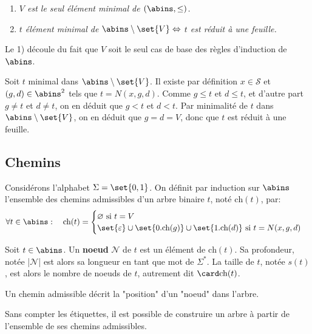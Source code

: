 \documentclass{scrartcl}
\begin{document}
			\begin{enumerate}
				\item \textsl{$V$ est le seul élément minimal de $(\abins, \leq)$.}
				\item \textsl{$t$ élément minimal de $\abins\setminus\set{V} \Leftrightarrow$ $t$ est réduit à une feuille.}
			\end{enumerate}
			\begin{demo}
				\item Le 1) découle du fait que $V$ soit le seul cas de base des règles d'induction de $\abins$.
				\item Soit $t$ minimal dans $\abins\setminus\set{V}$. 
				Il existe par définition $x \in \mathcal{S}$ et $(g,d) \in \abins^2$ tels que $t = N(x,g,d)$.
				Comme $g \leq t$ et $d \leq t$, et d'autre part $g \neq t$ et $d \neq t$,
				on en déduit que $g < t$ et $d < t$. 
				Par minimalité de $t$ dans $\abins\setminus\set{V}$, on en déduit que $g = d =V$,
				donc que $t$ est réduit à une feuille.
			\end{demo}

		\subsection{Chemins}
			Considérons l'alphabet $\Sigma = \set{0,1}$. 
			On définit par induction sur $\abins$ l'ensemble des chemins admissibles d'un arbre binaire $t$,
			noté $\text{ch}(t)$, par:
			\[
				\forall t \in \abins: \quad \text{ch}(t) = 
				\begin{cases}
					\varnothing \text{ si } t = V \\ 
					\set{\varepsilon}\cup\set{0.\text{ch}(g)}\cup\set{1.\text{ch}(d)} \text{ si } t = N(x,g,d)
				\end{cases}
			\]

			Soit $t \in \abins$. Un \textbf{noeud} $\mathcal{N}$ de $t$ est un élément de $\text{ch}(t)$. 
			Sa profondeur, notée |$\mathcal{N}$| est alors sa longueur en tant que mot de $\Sigma^*$.
			La taille de $t$, notée $s(t)$, est alors le nombre de noeuds de $t$, 
			autrement dit $\card\text{ch}(t)$.

			\rem Un chemin admissible décrit la "position" d'un "noeud" dans l'arbre.

			\rem Sans compter les étiquettes, il est possible de construire un arbre à partir de l'ensemble de ses chemins admissibles.
\end{document}
